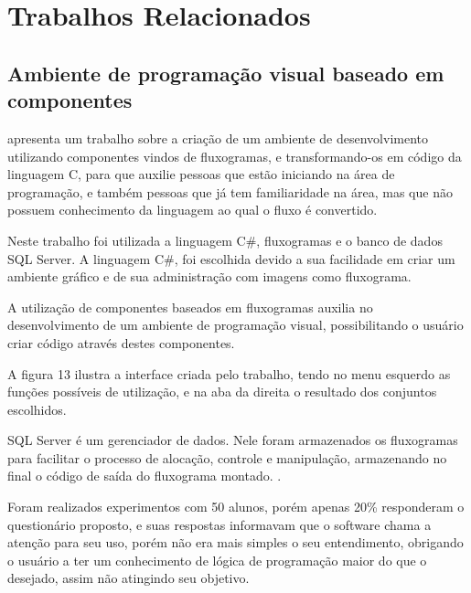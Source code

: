 \documentclass[12pt,oneside,a4paper,chapter=TITLE,section=TITLE,sumario=tradicional]{abntex2}
\begin{document}
\chapter{Trabalhos Relacionados}
\label{cap:trabalhos-relacionados}

\section{Ambiente de programação visual baseado em componentes}
\label{sec:ambiente-de-programacao-visual-baseado-em-componentes}
 
\cite{juliana2015} apresenta um trabalho sobre a criação de um ambiente de desenvolvimento utilizando componentes vindos de fluxogramas, e transformando-os em código da linguagem C, para que auxilie pessoas que estão iniciando na área de programação, e também pessoas que já tem familiaridade na área, mas que não possuem conhecimento da linguagem ao qual o fluxo é convertido.

Neste trabalho foi utilizada a linguagem C\#, fluxogramas e o banco de dados SQL Server. A linguagem C\#, foi escolhida devido a sua facilidade em criar um ambiente gráfico e de sua administração com imagens como fluxograma.

A utilização de componentes baseados em fluxogramas auxilia no desenvolvimento de um ambiente de programação visual, possibilitando o usuário criar código através destes componentes.

A figura 13 ilustra a interface criada pelo trabalho, tendo no menu esquerdo as funções possíveis de utilização, e na aba da direita o resultado dos conjuntos escolhidos. 

\begin{figure}[htb]
\end{figure}

SQL Server é um gerenciador de dados. Nele foram armazenados os fluxogramas para facilitar o processo de alocação, controle e manipulação, armazenando no final o código de saída do fluxograma montado. \cite{juliana2015}.

Foram realizados experimentos com 50 alunos, porém apenas 20\% responderam o questionário proposto, e suas respostas informavam que o software chama a atenção para seu uso, porém não era mais simples o seu entendimento, obrigando o usuário a ter um conhecimento de lógica de programação maior do que o desejado, assim não atingindo seu objetivo. 
\end{document}
